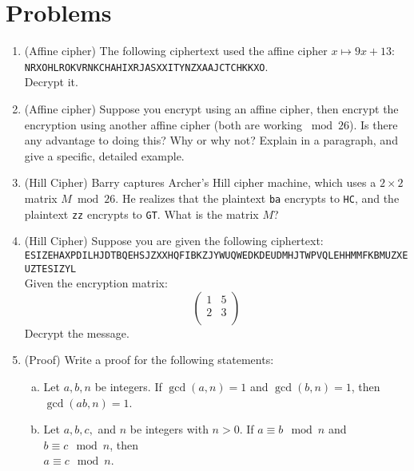 \documentclass[12pt]{amsart}
\theoremstyle{plain}
\theoremstyle{definition}
\begin{document}
\section{Problems}


\begin{enumerate}[1.]
	\item (Affine cipher) The following ciphertext used the affine cipher $x \mapsto 9x+13$:\\ \texttt{NRXOHLROKVRNKCHAHIXRJASXXITYNZXAAJCTCHKKXO}.\\ Decrypt it.\\
	\item (Affine cipher) Suppose you encrypt using an affine cipher, then encrypt the encryption using another affine cipher (both are working $\bmod 26$).  Is there any advantage to doing this?  Why or why not?  Explain in a paragraph, and give a specific, detailed example.\\
	\item (Hill Cipher)  Barry captures Archer's Hill cipher machine, which uses a $2 \times 2$ matrix $M \bmod 26$.  He realizes that the plaintext \texttt{ba} encrypts to \texttt{HC}, and the plaintext \texttt{zz} encrypts to \texttt{GT}.  What is the matrix $M$?\\
	\item (Hill Cipher) Suppose you are given the following ciphertext:\\
	\texttt{ESIZEHAXPDILHJDTBQEHSJZXXHQFIBKZJYWUQWEDKDEUDMHJTWPVQLEHHMMFKBMUZXEUZTESIZYL}\\
	Given the encryption matrix:
	$$\left(\begin{array}{rr}
	1 & 5\\
	2 & 3\\
	\end{array}\right)$$
	Decrypt the message.\\
	\newpage \item (Proof) Write a proof for the following statements:\\
		\begin{enumerate}[a.]
			\item Let $a,b,n$ be integers.  If $\gcd(a,n) = 1$ and $\gcd(b,n) = 1$, then $\gcd(ab,n) = 1$.\\
			\item Let $a,b,c,$ and $n$ be integers with $n > 0$.  If $a \equiv b \mod n$ and  $b \equiv c \mod n$, then\\ $a \equiv c \mod n$.\\
		\end{enumerate}

\end{enumerate}
\end{document}
